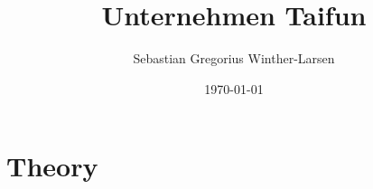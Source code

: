 \documentclass[twoside, english, notitlepage, 10pt]{uiofysmaster}
\author{Sebastian Gregorius Winther-Larsen}
\title{Unternehmen Taifun}
\date{\today}
\begin{document}
\frontmatter
    \maketitle

    \tableofcontents

\mainmatter

    \part{Theory}

        
    
\end{document}
